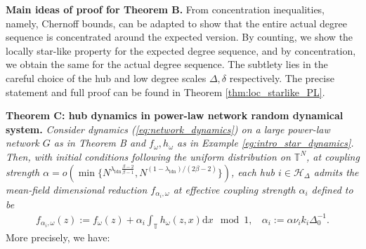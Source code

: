 \documentclass[a4paper]{article}
\theoremstyle{plain}
\theoremstyle{definition}
\newcommand{\T}{\mathbb{T}}
\newcommand{\Hil}{\mathcal{H}}
\begin{document}
\textbf{Main ideas of proof for Theorem B.} From concentration inequalities, namely, Chernoff bounds, \cite[Lemma 5.7]{Chung_2006} can be adapted to show that the entire actual degree sequence is concentrated around the expected version. By counting, we show the locally star-like property for the expected degree sequence, and by concentration, we obtain the same for the actual degree sequence. The subtlety lies in the careful choice of the hub and low degree scales $\Delta,\delta$ respectively. The precise statement and full proof can be found in Theorem \ref{thm:loc_starlike_PL}.




\textbf{Theorem C: hub dynamics in power-law network random dynamical system.}
\textit{ Consider dynamics (\ref{eq:network_dynamics}) on a large power-law network $G$ as in Theorem B and $f_{\omega},h_{\omega}$ as in Example \ref{eg:intro_star_dynamics}. Then, with initial conditions following the uniform distribution on $\T^N$, at coupling strength $\alpha = o\left(  \min\{ N^{\lambda_{\mathrm{ldn}}\frac{\beta-2}{\beta-1}} , N^{(1-\lambda_{\mathrm{ldn}})/(2\beta-2)}\} \right)$, each hub $i\in\Hil_{\Delta}$ admits the mean-field dimensional reduction $f_{\alpha_i,\omega}$ at effective coupling strength $\alpha_i$ defined to be
	\begin{align*}
		f_{\alpha_i, \omega}(z):= f_{\omega}(z) + \alpha_i\int_{\T} h_{\omega}(z, x)\mathrm{d}x\mod 1,~~~~\alpha_i:= \alpha \nu_i  k_i\Delta_0^{-1}.
	\end{align*}
}
More precisely, we have:
\end{document}
